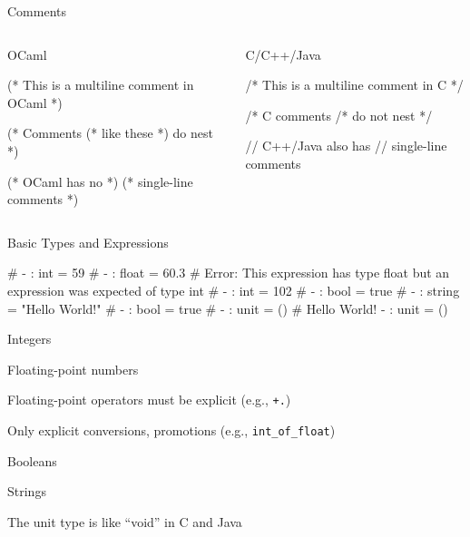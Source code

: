 \documentclass{plt}
\begin{document}
\begin{frame}[fragile]{Comments}

  \begin{columns}
    \begin{column}[t]{0.5\textwidth}
OCaml
\begin{ocaml}
(* This is a multiline
   comment in OCaml *)

(* Comments
    (* like these *)
   do nest
*)

(* OCaml has no *)
(* single-line comments *)
\end{ocaml}
    \end{column}
    \begin{column}[t]{0.5\textwidth}
C/C++/Java
\begin{C}
/* This is a multiline
   comment in C */

/* C comments
     /* do not
   nest
 */

// C++/Java also has
// single-line comments
\end{C}
    \end{column}
  \end{columns}
\end{frame}

\begin{frame}[fragile]{Basic Types and Expressions}
\begin{minipage}{0.5\textwidth}
\begin{interactive}
# 
- : int = 59
\li
# 
- : float = 60.3
\li
# 
Error: This expression has type 
float but an expression was 
expected of type int
\li
# 
- : int = 102
\li
# 
- : bool = true
\li
# 
- : string = "Hello World!"
\li
# 
- : bool = true
\li
# \type{();;}
- : unit = ()
\li
# 
Hello World!
- : unit = ()
\end{interactive}
\end{minipage}\hfill%
\begin{minipage}{0.41\textwidth}
  \baselineskip
  \raggedright

  Integers

  Floating-point numbers
  
  Floating-point operators must be explicit (e.g., \texttt{+.})

  Only explicit conversions, promotions  (e.g., \texttt{int\_of\_float})

  Booleans

  Strings  
   
  The unit type is like ``void'' in C and Java
\end{minipage}
\end{frame}
\end{document}
